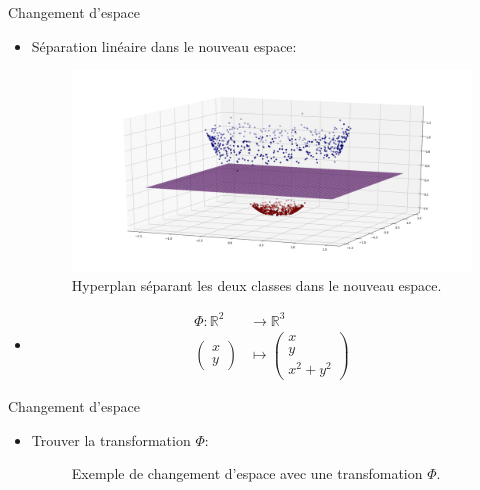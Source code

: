 \documentclass[8pt]{beamer}
\begin{document}
	\begin{frame}{Changement d'espace}
		\begin{itemize}
			\item <1-> Séparation linéaire dans le nouveau espace:
			\begin{figure}[H]
				\includegraphics[width=.5\textwidth]{images/samples/separation_x_2_y_2}
				\caption*{ Hyperplan séparant les deux classes dans le nouveau espace.}

			\end{figure}
			\item <2-> \begin{align*}
				\Phi: \mathbb{R}^2 &\rightarrow \mathbb{R}^3 \\
				\begin{pmatrix}
					x \\
					y
				\end{pmatrix} &\mapsto \begin{pmatrix}
					x \\
					y \\
					x^2 + y^2
				\end{pmatrix}
			\end{align*}
		\end{itemize}
	\end{frame}
	\begin{frame}{Changement d'espace}
		\begin{itemize}
			\item  Trouver la transformation $\Phi$:
			\begin{figure}[H]
				{
					\caption*{Exemple de changement d'espace avec une transfomation $\Phi$.}
				}
			\end{figure}
		\end{itemize}
	\end{frame}
\end{document}
